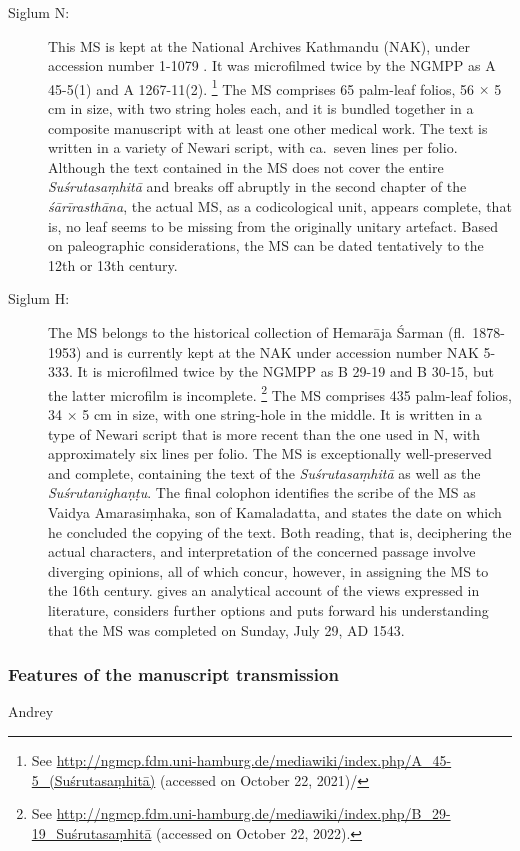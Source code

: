 \begin{description}
\item[Siglum N:] This MS is kept at the National Archives Kathmandu (NAK), under accession number 1-1079 . It was microfilmed twice by the NGMPP as A 45-5(1) and A 1267-11(2).%
    \footnote{%
See 
\url{http://ngmcp.fdm.uni-hamburg.de/mediawiki/index.php/A_45-5_(Suśrutasaṃhitā)}
 (accessed on October 22, 2021)/
    } 
The MS comprises 65 palm-leaf folios, 56 $\times$ 5 cm in size, with two string holes each, and it is bundled together in a composite manuscript with at least one other medical work. The text is written in a variety of Newari script, with ca.\ seven lines per folio. Although the text contained in the MS does not cover the entire \emph{Suśrutasaṃhitā} and breaks off abruptly in the second chapter of the \emph{śārīrasthāna}, the actual MS, as a codicological unit, appears complete, that is, no leaf seems to be missing from the originally unitary artefact. Based on paleographic considerations, the MS can be dated tentatively to the 12th or 13th century.

\item[Siglum H:] The MS belongs to the historical collection of Hemarāja Śarman (fl.\ 1878-1953) and is currently kept at the NAK under accession number NAK 5-333. It is microfilmed twice by the NGMPP as B 29-19 and B 30-15, but the latter microfilm is incomplete.%
    \footnote{%
    See 
    \url{http://ngmcp.fdm.uni-hamburg.de/mediawiki/index.php/B_29-19_Suśrutasaṃhitā}
     (accessed on October 22, 2022).
    } 
The MS comprises 435 palm-leaf folios, 34 $\times$ 5 cm in size, with one string-hole in the middle. It is written in a type of Newari script that is more recent than the one used in N, with approximately six lines per folio. The MS is exceptionally well-preserved and complete, containing the text of the \emph{Suśrutasaṃhitā} as well as the \emph{Suśrutanighaṇṭu}. The final colophon identifies the scribe of the MS as Vaidya Amarasiṃhaka, son of Kamaladatta, and states the date on which he concluded the copying of the text. Both reading, that is, deciphering the actual characters, and interpretation of the concerned passage involve diverging opinions, all of which concur, however, in assigning the MS to the 16th century. \textcites[21--26]{kleb-2021b} gives an analytical account of the views expressed in literature, considers further options and puts forward his understanding that the MS was completed on Sunday, July 29, AD 1543.  
\end{description}
  
\subsubsection{Features of the manuscript transmission}
Andrey
